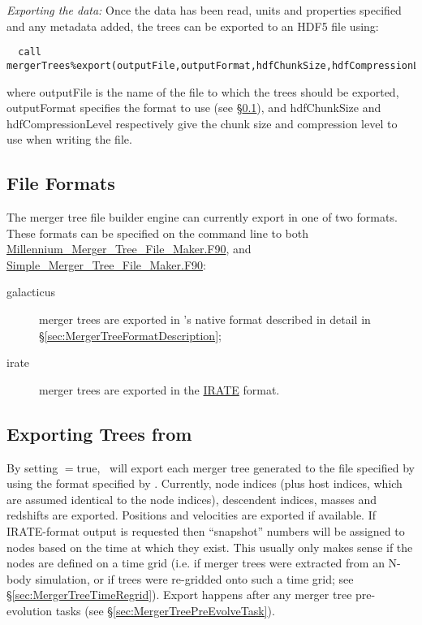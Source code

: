 \noindent \emph{Exporting the data:} Once the data has been read, units and properties specified and any metadata added, the trees can be exported to an HDF5 file using:
\begin{verbatim}
  call mergerTrees%export(outputFile,outputFormat,hdfChunkSize,hdfCompressionLevel)
\end{verbatim}
where {\normalfont \ttfamily outputFile} is the name of the file to which the trees should be exported, {\normalfont \ttfamily outputFormat} specifies the format to use (see \S\ref{sec:mergerTreeBuilderFileFormats}), and {\normalfont \ttfamily hdfChunkSize} and {\normalfont \ttfamily hdfCompressionLevel} respectively give the chunk size and compression level to use when writing the file.

\subsection{File Formats}\label{sec:mergerTreeBuilderFileFormats}

The merger tree file builder engine can currently export in one of two formats. These formats can be specified on the command line to both \hyperlink{Millennium_Merger_Tree_File_Maker.F90}{{\normalfont \ttfamily Millennium\_Merger\_Tree\_File\_Maker.F90}}, and \hyperlink{Simple_Merger_Tree_File_Maker.F90}{{\normalfont \ttfamily Simple\_Merger\_Tree\_File\_Maker.F90}}:
\begin{description}
 \item [{\normalfont \ttfamily galacticus}] merger trees are exported in \glc's native format described in detail in \S\ref{sec:MergerTreeFormatDescription};
 \item [{\normalfont \ttfamily irate}] merger trees are exported in the \href{https://bitbucket.org/eteq/irate-format}{\normalfont \ttfamily IRATE} format.
\end{description}

\subsection{Exporting Trees from \glc}

By setting {\normalfont \ttfamily [mergerTreesWrite]}$=${\normalfont \ttfamily true}, \glc\ will export each merger tree generated to the file specified by {\normalfont \ttfamily [mergerTreeExportFileName]} using the format specified by {\normalfont \ttfamily [mergerTreeExportOutputFormat]}. Currently, node indices (plus host indices, which are assumed identical to the node indices), descendent indices, masses and redshifts are exported. Positions and velocities are exported if available. If {\normalfont \ttfamily IRATE}-format output is requested then ``snapshot'' numbers will be assigned to nodes based on the time at which they exist. This usually only makes sense if the nodes are defined on a time grid (i.e. if merger trees were extracted from an N-body simulation, or if trees were re-gridded onto such a time grid; see \S\ref{sec:MergerTreeTimeRegrid}). Export happens after any merger tree pre-evolution tasks (see \S\ref{sec:MergerTreePreEvolveTask}).
